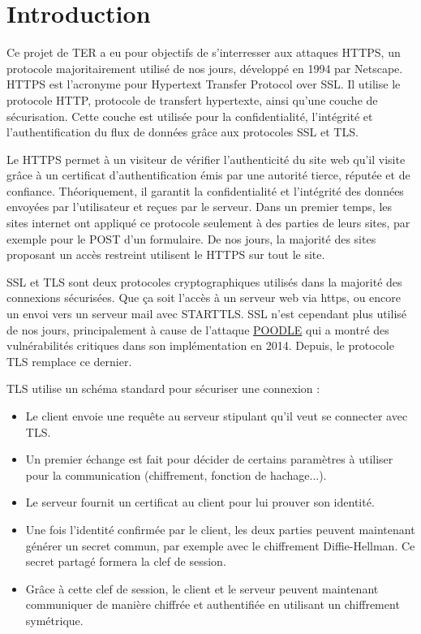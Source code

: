 \chapter*{Introduction}

Ce projet de TER a eu pour objectifs de s'interresser aux attaques HTTPS, un protocole majoritairement utilisé de nos jours, développé en 1994 par Netscape. HTTPS est l'acronyme pour Hypertext Transfer Protocol over SSL. Il utilise le protocole HTTP, protocole de transfert hypertexte, ainsi qu'une couche de sécurisation. Cette couche est utilisée pour la confidentialité, l'intégrité et l'authentification du flux de données grâce aux protocoles SSL et TLS.

Le HTTPS permet à un visiteur de vérifier l'authenticité du site web qu'il visite grâce à un certificat d'authentification émis par une autorité tierce, réputée et de confiance. Théoriquement, il garantit la confidentialité et l'intégrité des données envoyées par l'utilisateur et reçues par le serveur. Dans un premier temps, les sites internet ont appliqué ce protocole seulement à des parties de leurs sites, par exemple pour le POST d'un formulaire. De nos jours, la majorité des sites proposant un accès restreint utilisent le HTTPS sur tout le site.

SSL et TLS sont deux protocoles cryptographiques utilisés dans la majorité des connexions sécurisées. Que ça soit l'accès à un serveur web via https, ou encore un envoi vers un serveur mail avec STARTTLS. SSL n'est cependant plus utilisé de nos jours, principalement à cause de l'attaque \hyperref[sec:poodle]{POODLE} qui a montré des vulnérabilités critiques dans son implémentation en 2014. Depuis, le protocole TLS remplace ce dernier.

TLS utilise un schéma standard pour sécuriser une connexion :

\begin{itemize}
    \item Le client envoie une requête au serveur stipulant qu'il veut se connecter avec TLS.
    \item Un premier échange est fait pour décider de certains paramètres à utiliser pour la communication (chiffrement, fonction de hachage...).
    \item Le serveur fournit un certificat au client pour lui prouver son identité.
    \item Une fois l'identité confirmée par le client, les deux parties peuvent maintenant générer un secret commun, par exemple avec le chiffrement Diffie-Hellman. Ce secret partagé formera la clef de session.
    \item Grâce à cette clef de session, le client et le serveur peuvent maintenant communiquer de manière chiffrée et authentifiée en utilisant un chiffrement symétrique.
\end{itemize}

